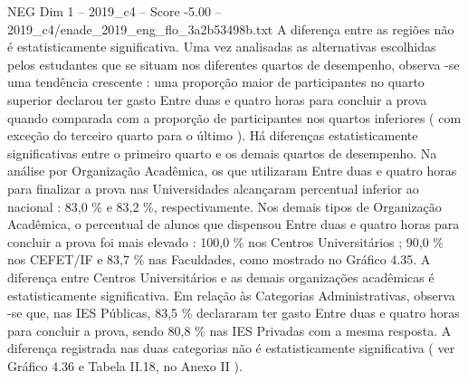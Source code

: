 \begin{textsample}{NEG Dim 1 – 2019\_c4 – Score -5.00 – 2019\_c4/enade\_2019\_eng\_flo\_3a2b53498b.txt}
A diferença entre as regiões não é estatisticamente significativa.
Uma vez analisadas as alternativas escolhidas pelos estudantes que se situam nos diferentes quartos de desempenho, observa -se uma tendência crescente : uma proporção maior de participantes no quarto superior declarou ter gasto Entre duas e quatro horas para concluir a prova quando comparada com a proporção de participantes nos quartos inferiores ( com exceção do terceiro quarto para o último ).
Há diferenças estatisticamente significativas entre o primeiro quarto e os demais quartos de desempenho.
Na análise por Organização Acadêmica, os que utilizaram Entre duas e quatro horas para finalizar a prova nas Universidades alcançaram percentual inferior ao nacional : 83,0 \% e 83,2 \%, respectivamente.
Nos demais tipos de Organização Acadêmica, o percentual de alunos que dispensou Entre duas e quatro horas para concluir a prova foi mais elevado : 100,0 \% nos Centros Universitários ; 90,0 \% nos CEFET/IF e 83,7 \% nas Faculdades, como mostrado no Gráfico 4.35.
A diferença entre Centros Universitários e as demais organizações acadêmicas é estatisticamente significativa.
Em relação às Categorias Administrativas, observa -se que, nas IES Públicas, 83,5 \% declararam ter gasto Entre duas e quatro horas para concluir a prova, sendo 80,8 \% nas IES Privadas com a mesma resposta.
A diferença registrada nas duas categorias não é estatisticamente significativa ( ver Gráfico 4.36 e Tabela II.18, no Anexo II ).

\end{textsample}
